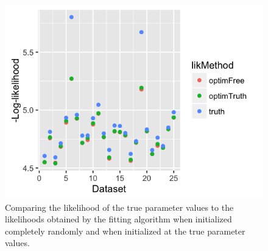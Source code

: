\documentclass[12pt,reqno,final,pdftex]{amsart}\usepackage[]{graphicx}\usepackage[]{color}
\newenvironment{knitrout}{}{} %
\theoremstyle{plain}
\numberwithin{equation}{part}
\begin{document}
\begin{knitrout}\scriptsize
{}\color{fgcolor}\begin{figure}

\includegraphics[width=\linewidth]{figure/lik-comparison-1} \hfill{}

\caption[Comparing the likelihood of the true parameter values to the likelihoods obtained by the fitting algorithm when initialized completely randomly and when initialized at the true parameter values]{Comparing the likelihood of the true parameter values to the likelihoods obtained by the fitting algorithm when initialized completely randomly and when initialized at the true parameter values.}\label{fig:lik-comparison}
\end{figure}


\end{knitrout}
\end{document}
